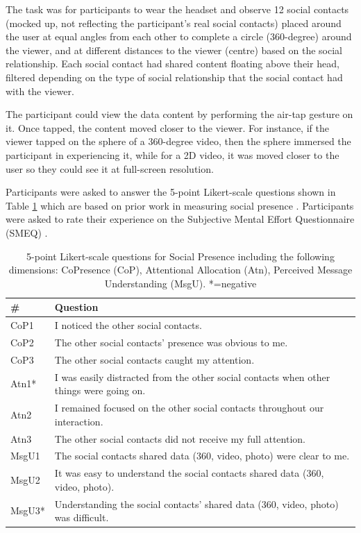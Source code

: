 The task was for participants to wear the headset and observe 12 social contacts (mocked up, not reflecting the participant's real social contacts) placed around the user at equal angles from each other to complete a circle (360-degree) around the viewer, and at different distances to the viewer (centre) based on the social relationship. Each social contact had shared content floating above their head, filtered depending on the type of social relationship that the social contact had with the viewer. 

The participant could view the data content by performing the air-tap gesture on it. Once tapped, the content moved closer to the viewer. For instance, if the viewer tapped on the sphere of a 360-degree video, then the sphere immersed the participant in experiencing it, while for a 2D video, it was moved closer to the user so they could see it at full-screen resolution.

Participants were asked to answer the 5-point Likert-scale questions shown in Table \ref{tbl:chi18:questions} which are based on prior work in measuring social presence \cite{Biocca2003}. Participants were asked to rate their experience on the Subjective Mental Effort Questionnaire (SMEQ) \cite{Sauro2009}. 

\begin{table}[ht]
    \centering
    \begin{tabular}{l p{10cm}}
        \hline
        \#  & Question \\ \hline
        CoP1 & I noticed the other social contacts.  \\
        CoP2 & The other social contacts' presence was obvious to me. \\
        CoP3 & The other social contacts caught my attention. \\ \hline
        Atn1* & I was easily distracted from the other social contacts when other things were going on. \\
        Atn2 & I remained focused on the other social contacts throughout our interaction. \\
        Atn3 & The other social contacts did not receive my full attention.  \\ \hline
        MsgU1 & The social contacts shared data (360, video, photo) were clear to me.  \\
        MsgU2 & It was easy to understand the social contacts shared data (360, video, photo).  \\
        MsgU3* & Understanding the social contacts' shared data (360, video, photo) was difficult.  \\ \hline
    \end{tabular}
    \caption{5-point Likert-scale questions for Social Presence including the following dimensions: CoPresence (CoP), Attentional Allocation (Atn), Perceived Message Understanding (MsgU). *=negative} 
      \label{tbl:chi18:questions}
\end{table}

